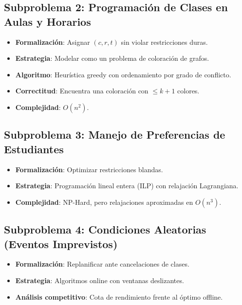 \documentclass[12pt, a4paper]{article}
\begin{document}
\subsection{Subproblema 2: Programación de Clases en Aulas y Horarios}
\begin{itemize}
    \item \textbf{Formalización}: Asignar \( (c, r, t) \) sin violar restricciones duras.
    \item \textbf{Estrategia}: Modelar como un problema de coloración de grafos.
    \item \textbf{Algoritmo}: Heurística greedy con ordenamiento por grado de conflicto.
    \item \textbf{Correctitud}: Encuentra una coloración con \( \leq k+1 \) colores.
    \item \textbf{Complejidad}: \( O(n^2) \).
\end{itemize}

\subsection{Subproblema 3: Manejo de Preferencias de Estudiantes}
\begin{itemize}
    \item \textbf{Formalización}: Optimizar restricciones blandas.
    \item \textbf{Estrategia}: Programación lineal entera (ILP) con relajación Lagrangiana.
    \item \textbf{Complejidad}: NP-Hard, pero relajaciones aproximadas en \( O(n^3) \).
\end{itemize}

\subsection{Subproblema 4: Condiciones Aleatorias (Eventos Imprevistos)}
\begin{itemize}
    \item \textbf{Formalización}: Replanificar ante cancelaciones de clases.
    \item \textbf{Estrategia}: Algoritmos online con ventanas deslizantes.
    \item \textbf{Análisis competitivo}: Cota de rendimiento frente al óptimo offline.
\end{itemize}
\end{document}
